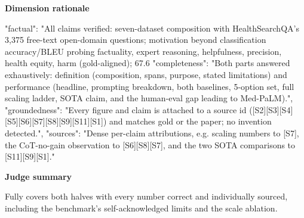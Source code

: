 \documentclass[10pt]{article}
\begin{document}
\textbf{Dimension rationale}
\begin{EvidenceText}
{
  "factual": "All claims verified: seven-dataset composition with HealthSearchQA's 3,375 free-text open-domain questions; motivation beyond classification accuracy/BLEU probing factuality, expert reasoning, helpfulness, precision, health equity, harm (gold-aligned); 67.6%
  "completeness": "Both parts answered exhaustively: definition (composition, spans, purpose, stated limitations) and performance (headline, prompting breakdown, both baselines, 5-option set, full scaling ladder, SOTA claim, and the human-eval gap leading to Med-PaLM).",
  "groundedness": "Every figure and claim is attached to a source id ([S2][S3][S4][S5][S6][S7][S8][S9][S11][S1]) and matches gold or the paper; no invention detected.",
  "sources": "Dense per-claim attributions, e.g. scaling numbers to [S7], the CoT-no-gain observation to [S6][S8][S7], and the two SOTA comparisons to [S11][S9][S1]."
}
\end{EvidenceText}

\textbf{Judge summary}
\begin{EvidenceText}
Fully covers both halves with every number correct and individually sourced, including the benchmark's self-acknowledged limits and the scale ablation.
\end{EvidenceText}
\end{document}
